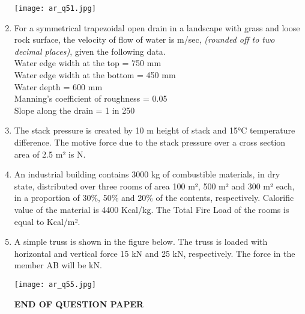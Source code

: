 \documentclass[12pt]{article}
\begin{document}
\begin{enumerate}[label=Q.\arabic*,start=26]
		\begin{center}{
				\texttt{[image: ar\_q51.jpg]}
		}\end{center}

	\item For a symmetrical trapezoidal open drain in a landscape with grass and loose rock surface, the velocity of flow of water is \underline{\hspace{2cm}} m/sec, \textit{(rounded off to two decimal places)}, given the following data. \\
		Water edge width at the top = 750 mm \\
		Water edge width at the bottom = 450 mm \\
		Water depth = 600 mm \\
		Manning’s coefficient of roughness = 0.05 \\
		Slope along the drain = 1 in 250

	\item The stack pressure is created by 10 m height of stack and 15°C temperature difference. The motive force due to the stack pressure over a cross section area of 2.5 m² is \underline{\hspace{2cm}} N.

	\item An industrial building contains 3000 kg of combustible materials, in dry state, distributed over three rooms of area 100 m², 500 m² and 300 m² each, in a proportion of 30\%, 50\% and 20\% of the contents, respectively. Calorific value of the material is 4400 Kcal/kg. The Total Fire Load of the rooms is equal to \underline{\hspace{2cm}} Kcal/m².

	\item A simple truss is shown in the figure below. The truss is loaded with horizontal and vertical force 15 kN and 25 kN, respectively. The force in the member AB will be \underline{\hspace{2cm}} kN.
		\begin{center}{
				\texttt{[image: ar\_q55.jpg]}
		}\end{center}

		\begin{center}
			\textbf{END OF QUESTION  PAPER}
		\end{center}



\end{enumerate}
\end{document}
